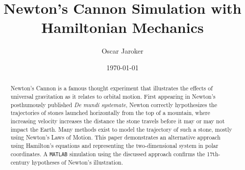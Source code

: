 \documentclass[aps,twocolumn]{revtex4-1}
\begin{document}
\title{Newton's Cannon Simulation with Hamiltonian Mechanics}


\author{Oscar Jaroker}


\date{\today}

\begin{abstract}
Newton's Cannon is a famous thought experiment that illustrates the effects of universal gravitation as it relates to orbital motion. First appearing in Newton's posthumously published \textit{De mundi systemate}, Newton correctly hypothesizes the trajectories of stones launched horizontally from the top of a mountain, where increasing velocity increases the distance the stone travels before it may or may not impact the Earth. Many methods exist to model the trajectory of such a stone, mostly using Newton's Laws of Motion. This paper demonstrates an alternative approach using Hamilton's equations and representing the two-dimensional system in polar coordinates. A \verb|MATLAB| simulation using the discussed approach confirms the 17th-century hypotheses of Newton's illustration. 

\end{abstract}

\maketitle 
\end{document}
